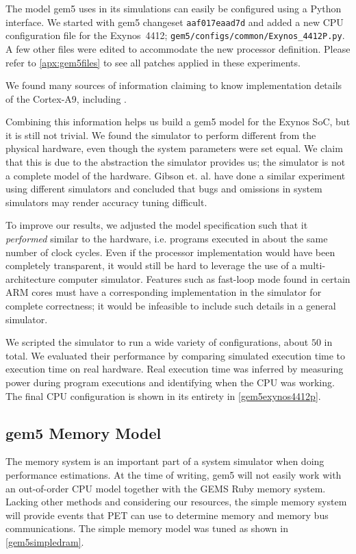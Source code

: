 The model gem5 uses in its simulations can easily be configured using a Python
interface. We started with gem5 changeset \texttt{aaf017eaad7d} and added a new
CPU configuration file for the Exynos~4412;
\texttt{gem5/configs/common/Exynos\_4412P.py}. A few other files were edited to
accommodate the new processor definition. Please refer to
\autoref{apx:gem5files} to see all patches applied in these experiments.

We found many sources of information claiming to know implementation details of
the Cortex-A9, including
\cite{butko2012accuracy,blem2013detailed,armtech,exynoswiki,odroidwiki,geekland,7cpu,armcortexa9specs}.

Combining this information helps us build a gem5 model for the Exynos SoC, but
it is still not trivial.  We found the simulator to perform different from the
physical hardware, even though the system parameters were set equal. We claim
that this is due to the abstraction the simulator provides us; the simulator is
not a complete model of the hardware. Gibson et. al. \cite{gibson2000flash} have
done a similar experiment using different simulators and concluded that bugs and
omissions in system simulators may render accuracy tuning difficult.

To improve our results, we adjusted the model specification such that it
\textit{performed} similar to the hardware, i.e. programs executed in about the
same number of clock cycles. Even if the processor implementation would have
been completely transparent, it would still be hard to leverage the use of a
multi-architecture computer simulator. Features such as fast-loop mode found in
certain ARM cores must have a corresponding implementation in the simulator for
complete correctness; it would be infeasible to include such details in a
general simulator.

We scripted the simulator to run a wide variety of configurations, about $50$ in
total. We evaluated their performance by comparing simulated execution time to
execution time on real hardware. Real execution time was inferred by measuring
power during program executions and identifying when the CPU was working. The
final CPU configuration is shown in its entirety in \autoref{gem5exynos4412p}.


\subsection{gem5 Memory Model}
The memory system is an important part of a system simulator when doing
performance estimations. At the time of writing, gem5 will not easily work with
an out-of-order CPU model together with the GEMS Ruby memory system. Lacking
other methods and considering our resources, the simple memory system will
provide events that PET can use to determine memory and memory bus
communications. The simple memory model was tuned as shown in
\autoref{gem5simpledram}.
